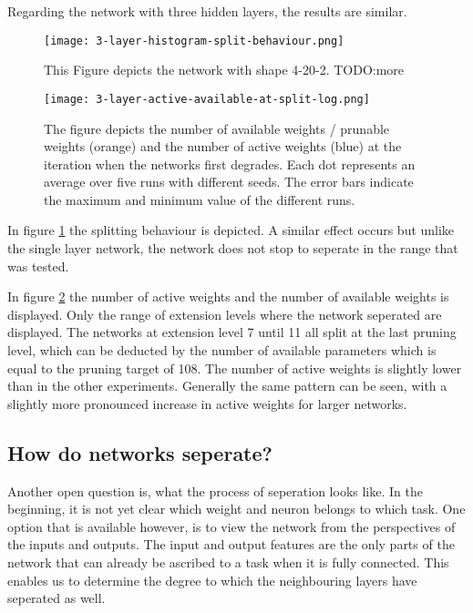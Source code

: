 Regarding the network with three hidden layers, the results are similar.
\begin{figure}[ht]
    \centering
    \texttt{[image: 3-layer-histogram-split-behaviour.png]}
    \caption{This Figure depicts the network with shape 4-20-2.
    TODO:more }
    \label{fig:3layer-histogram}
\end{figure}

\begin{figure}[ht]
    
    \centering
    \texttt{[image: 3-layer-active-available-at-split-log.png]}
    \caption{The figure depicts the number of available weights / prunable weights (orange) and the number of active weights (blue) at the iteration when the networks first degrades.
    Each dot represents an average over five runs with different seeds.
    The error bars indicate the maximum and minimum value of the different runs.}
    \label{fig:3layer-active}
\end{figure}

In figure \ref{fig:3layer-histogram} the splitting behaviour is depicted.
A similar effect occurs but unlike the single layer network, the network does not stop to seperate in the range that was tested. 

In figure \ref{fig:3layer-active} the number of active weights and the number of available weights is displayed.
Only the range of extension levels where the network seperated are displayed.
The networks at extension level 7 until 11 all split at the last pruning level, which can be deducted by the number of available parameters which is equal to the pruning target of 108.
The number of active weights is slightly lower than in the other experiments.
Generally the same pattern can be seen, with a slightly more pronounced increase in active weights for larger networks.

\subsection{How do networks seperate?}
Another open question is, what the process of seperation looks like.
In the beginning, it is not yet clear which weight and neuron belongs to which task.
One option that is available however, is to view the network from the perspectives of the inputs and outputs.
The input and output features are the only parts of the network that can already be ascribed to a task when it is fully connected.
This enables us to determine the degree to which the neighbouring layers have seperated as well.

